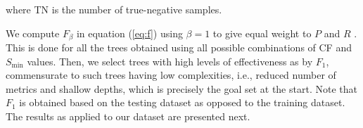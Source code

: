 %
where TN is the number of true-negative samples. 

We compute $F_{\beta}$ in equation (\ref{eq:f}) using $\beta = 1$ to give equal weight to $P$ and $R$ \citep{McCarthy_1995_Proc}. This is done for all the trees obtained using all possible combinations of CF and $S_{\min}$ values. Then, we select trees with high levels of effectiveness as  by $F_1$, commensurate to such trees having low complexities, i.e., reduced number of metrics and shallow depths, which is precisely the goal set at the start. Note that $F_1$ is obtained based on the testing dataset as opposed to the training dataset. The results as applied to our dataset are presented next.
